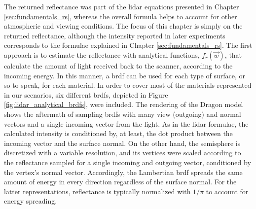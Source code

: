The returned reflectance was part of the \acrshort{lidar} equations presented in Chapter \ref{sec:fundamentals_rs}, whereas the overall formula helps to account for other atmospheric and viewing conditions. The focus of this chapter is simply on the returned reflectance, although the intensity reported in later experiments corresponds to the formulae explained in Chapter \ref{sec:fundamentals_rs}. The first approach is to estimate the reflectance with analytical functions, $f_{r}(\vec{w})$, that calculate the amount of light received back to the scanner, according to the incoming energy. In this manner, a \acrshort{brdf} can be used for each type of surface, or so to speak, for each material. In order to cover most of the materials represented in our scenarios, six different \acrshort{brdf}s, depicted in Figure \ref{fig:lidar_analytical_brdfs}, were included. The rendering of the Dragon model shows the aftermath of sampling \acrshort{brdf}s with many view (outgoing) and normal vectors and a single incoming vector from the light. As in the \acrshort{lidar} formulae, the calculated intensity is conditioned by, at least, the dot product between the incoming vector and the surface normal. On the other hand, the semisphere is discretized with a variable resolution, and its vertices were scaled according to the reflectance sampled for a single incoming and outgoing vector, conditioned by the vertex's normal vector. Accordingly, the Lambertian \acrshort{brdf} spreads the same amount of energy in every direction regardless of the surface normal. For the latter representations, reflectance is typically normalized with $1/\pi$ to account for energy spreading.

